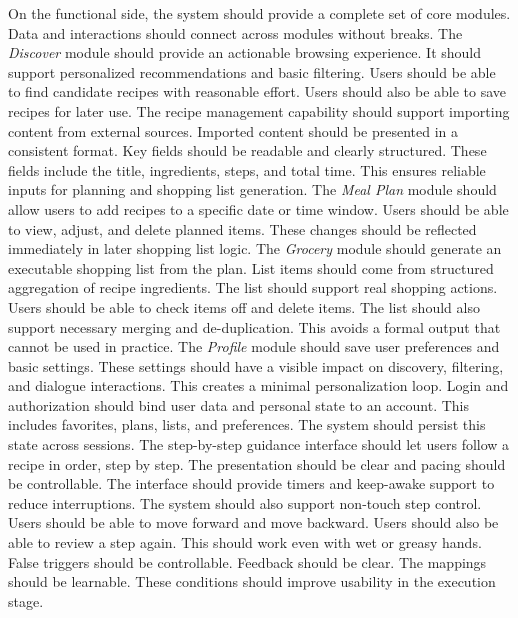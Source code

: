 \documentclass[journal]{IEEEtran}
\begin{document}
On the functional side, the system should provide a complete set of core modules. Data and interactions should connect across modules without breaks. The \textit{Discover} module should provide an actionable browsing experience. It should support personalized recommendations and basic filtering. Users should be able to find candidate recipes with reasonable effort. Users should also be able to save recipes for later use. The recipe management capability should support importing content from external sources. Imported content should be presented in a consistent format. Key fields should be readable and clearly structured. These fields include the title, ingredients, steps, and total time. This ensures reliable inputs for planning and shopping list generation. The \textit{Meal Plan} module should allow users to add recipes to a specific date or time window. Users should be able to view, adjust, and delete planned items. These changes should be reflected immediately in later shopping list logic. The \textit{Grocery} module should generate an executable shopping list from the plan. List items should come from structured aggregation of recipe ingredients. The list should support real shopping actions. Users should be able to check items off and delete items. The list should also support necessary merging and de-duplication. This avoids a formal output that cannot be used in practice. The \textit{Profile} module should save user preferences and basic settings. These settings should have a visible impact on discovery, filtering, and dialogue interactions. This creates a minimal personalization loop. Login and authorization should bind user data and personal state to an account. This includes favorites, plans, lists, and preferences. The system should persist this state across sessions. The step-by-step guidance interface should let users follow a recipe in order, step by step. The presentation should be clear and pacing should be controllable. The interface should provide timers and keep-awake support to reduce interruptions. The system should also support non-touch step control. Users should be able to move forward and move backward. Users should also be able to review a step again. This should work even with wet or greasy hands. False triggers should be controllable. Feedback should be clear. The mappings should be learnable. These conditions should improve usability in the execution stage.
\end{document}
